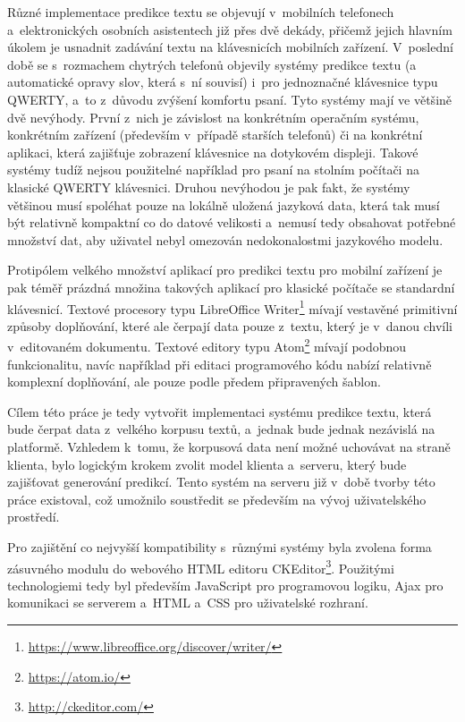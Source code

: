 \documentclass[a4paper,11pt,openany]{book} %
\begin{document}
Různé implementace predikce textu se objevují v~mobilních telefonech a~elektronických osobních asistentech již přes dvě dekády, přičemž jejich hlavním úkolem je usnadnit zadávání textu na klávesnicích mobilních zařízení. V~poslední době se s~rozmachem chytrých telefonů objevily systémy predikce textu (a automatické opravy slov, která s~ní souvisí) i~pro jednoznačné klávesnice typu QWERTY, a~to z~důvodu zvýšení komfortu psaní. Tyto systémy mají ve většině dvě nevýhody. První z~nich je závislost na konkrétním operačním systému, konkrétním zařízení (především v~případě starších telefonů) či na konkrétní aplikaci, která zajišťuje zobrazení klávesnice na dotykovém displeji. Takové systémy tudíž nejsou použitelné například pro psaní na stolním počítači na klasické QWERTY klávesnici. Druhou nevýhodou je pak fakt, že systémy většinou musí spoléhat pouze na lokálně uložená jazyková data, která tak musí být relativně kompaktní co do datové velikosti a~nemusí tedy obsahovat potřebné množství dat, aby uživatel nebyl omezován nedokonalostmi jazykového modelu.

Protipólem velkého množství aplikací pro predikci textu pro mobilní zařízení je pak téměř prázdná množina takových aplikací pro klasické počítače se standardní klávesnicí. Textové procesory typu LibreOffice Writer\footnote{\url{https://www.libreoffice.org/discover/writer/}} mívají vestavěné primitivní způsoby doplňování, které ale čerpají data pouze z~textu, který je v~danou chvíli v~editovaném dokumentu. Textové editory typu Atom\footnote{\url{https://atom.io/}} mívají podobnou funkcionalitu, navíc například při editaci programového kódu nabízí relativně komplexní doplňování, ale pouze podle předem připravených šablon.

Cílem této práce je tedy vytvořit implementaci systému predikce textu, která bude čerpat data z~velkého korpusu textů, a~jednak bude jednak nezávislá na platformě. Vzhledem k~tomu, že korpusová data není možné uchovávat na straně klienta, bylo logickým krokem zvolit model klienta a~serveru, který bude zajišťovat generování predikcí. Tento systém na serveru již v~době tvorby této práce existoval, což umožnilo soustředit se především na vývoj uživatelského prostředí. 

Pro zajištění co nejvyšší kompatibility s~různými systémy byla zvolena forma zásuvného modulu do webového HTML editoru CKEditor\footnote{\url{http://ckeditor.com/}}. Použitými technologiemi tedy byl především JavaScript pro programovou logiku, Ajax pro komunikaci se serverem a~HTML a~CSS pro uživatelské rozhraní.
\end{document}
